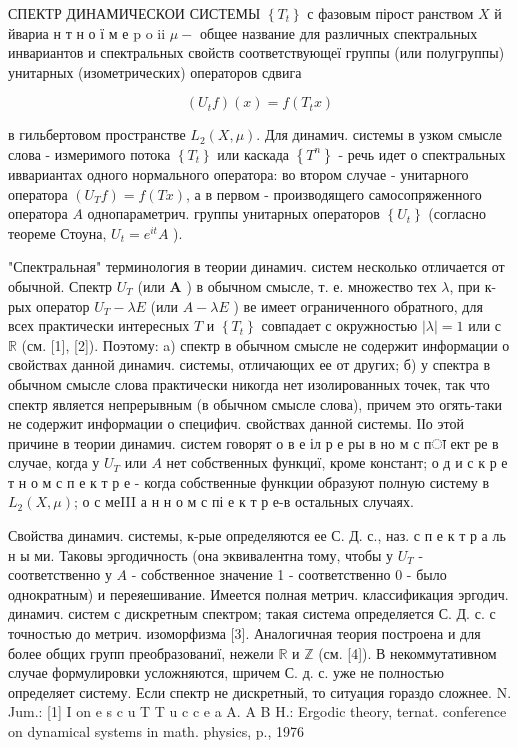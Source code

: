\documentclass[10pt]{article}
\begin{document}
СПЕКТР ДИНАМИЧЕСКОИ СИСТЕМЫ $\left\{T_{t}\right\}$ с фазовым пірост ранством $X$ й йвариа н т н о ї м е p o ii $\mu-$ общее название для различных спектральных инвариантов и спектральных свойств соответствующеї группы (или полугруппы) унитарных (изометрических) операторов сдвига



\[

\left(U_{t} f\right)(x)=f\left(T_{t} x\right)

\]



в гильбертовом пространстве $L_{2}(X, \mu)$. Для динамич. системы в узком смысле слова - измеримого потока $\left\{T_{t}\right\}$ или каскада $\left\{T^{n}\right\}$ - речь идет о спектральных иввариантах одного нормального оператора: во втором случае - унитарного оператора $\left(U_{T} f\right)=f(T x)$, а в первом - производящего самосопряженного оператора $A$ однопараметрич. группы унитарных операторов $\left\{U_{t}\right\}$ (согласно теореме Стоуна, $U_{t}=e^{i t} A$ ).



"Спектральная" терминология в теории динамич. систем несколько отличается от обычной. Спектр $U_{T}$ (или $\boldsymbol{A}$ ) в обычном смысле, т. е. множество тех $\lambda$, при к-рых оператор $U_{T}-\lambda E$ (или $A-\lambda E$ ) ве имеет ограниченного обратного, для всех практически интересных $T$ и $\left\{T_{t}\right\}$ совпадает с окружностью $|\lambda|=1$ или с $\mathbb{R}$ (см. [1], [2]). Поэтому: a) спектр в обычном смысле не содержит информации о свойствах данной динамич. системы, отличающих ее от других; б) у спектра в обычном смысле слова практически никогда нет изолированных точек, так что спектр является непрерывным (в обычном смысле слова), причем это огять-таки не содержит информации о специфич. свойствах данной системы. ІІо этой причине в теории динамич. систем говорят о в е іл р е ры в но м с пा ект ре в случае, когда у $U_{T}$ или $A$ нет собственных функциї, кроме констант; о д и с к р е т н о м с п е к т р е - когда собственные функции образуют полную систему в $L_{2}(X, \mu)$; о с меIII а н н о м с пі е к т р е-в остальных случаях.



Свойства динамич. системы, к-рые определяются ее С. Д. с., наз. с п е к т р а ль н ы ми. Таковы эргодичность (она эквивалентна тому, чтобы у $U_{T}$ - соответственно у $A$ - собственное значение 1 - соответственно 0 - было однократным) и переяешивание. Имеется полная метрич. классификация эргодич. динамич. систем с дискретным спектром; такая система определяется С. Д. с. с точностью до метрич. изоморфизма [3]. Аналогичная теория построена и для более общих групп преобразованиї, нежели $\mathbb{R}$ и $\mathbb{Z}$ (см. [4]). В некоммутативном случае формулировки усложняются, шричем С. д. с. уже не полностью определяет систему. Если спектр не дискретный, то ситуация гораздо сложнее. N. Jum.: [1] I on e s c u T T u c c e a A. A B H.: Ergodic theory, ternat. conference on dynamical systems in math. physics, p., 1976
\end{document}
